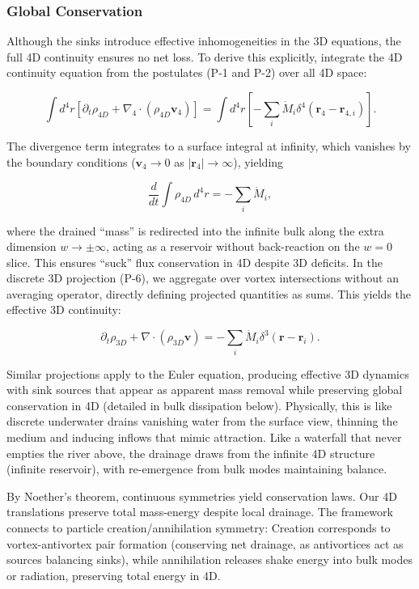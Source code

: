 \subsubsection{Global Conservation}
Although the sinks introduce effective inhomogeneities in the 3D equations, the full 4D continuity ensures no net loss. To derive this explicitly, integrate the 4D continuity equation from the postulates (P-1 and P-2) over all 4D space:

\begin{equation}
\int d^4 r \left[ \partial_t \rho_{4D} + \nabla_4 \cdot (\rho_{4D} \mathbf{v}_4) \right] = \int d^4 r \left[ -\sum_i \dot{M}_i \delta^4(\mathbf{r}_4 - \mathbf{r}_{4,i}) \right].
\end{equation}

The divergence term integrates to a surface integral at infinity, which vanishes by the boundary conditions ($\mathbf{v}_4 \to 0$ as $|\mathbf{r}_4| \to \infty$), yielding

\begin{equation}
\frac{d}{dt} \int \rho_{4D} \, d^4 r = -\sum_i \dot{M}_i,
\end{equation}

where the drained ``mass'' is redirected into the infinite bulk along the extra dimension $w \to \pm \infty$, acting as a reservoir without back-reaction on the $w=0$ slice. This ensures ``suck'' flux conservation in 4D despite 3D deficits. In the discrete 3D projection (P-6), we aggregate over vortex intersections without an averaging operator, directly defining projected quantities as sums. This yields the effective 3D continuity:

\begin{equation}
\partial_t \rho_{3D} + \nabla \cdot (\rho_{3D} \mathbf{v}) = -\sum_i \dot{M}_i \delta^3(\mathbf{r} - \mathbf{r}_i).
\end{equation}

Similar projections apply to the Euler equation, producing effective 3D dynamics with sink sources that appear as apparent mass removal while preserving global conservation in 4D (detailed in bulk dissipation below). Physically, this is like discrete underwater drains vanishing water from the surface view, thinning the medium and inducing inflows that mimic attraction. Like a waterfall that never empties the river above, the drainage draws from the infinite 4D structure (infinite reservoir), with re-emergence from bulk modes maintaining balance.

By Noether's theorem, continuous symmetries yield conservation laws. Our 4D translations preserve total mass-energy despite local drainage. The framework connects to particle creation/annihilation symmetry: Creation corresponds to vortex-antivortex pair formation (conserving net drainage, as antivortices act as sources balancing sinks), while annihilation releases shake energy into bulk modes or radiation, preserving total energy in 4D.

